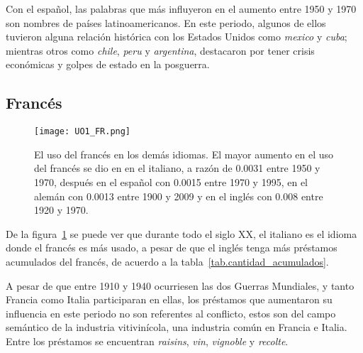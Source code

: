 Con el español, las palabras que más influyeron en el aumento entre 1950 y 1970 son nombres de países latinoamericanos. En este periodo, algunos de ellos tuvieron alguna relación histórica con los Estados Unidos como \textit{mexico} y \textit{cuba}; mientras otros como \textit{chile}, \textit{peru} y \textit{argentina}, destacaron por tener crisis económicas y golpes de estado en la posguerra.  
\label{D-EN}


 



\subsection{Francés} %

\begin{figure}[h!]
	\centering
	\texttt{[image: UO1\_FR.png]}
	\caption{El uso del francés en los demás idiomas. El mayor aumento en el uso del francés se dio en en el italiano, a razón de 0.0031 entre 1950 y 1970, después en el español con 0.0015 entre 1970 y 1995, en el alemán con 0.0013 entre 1900 y 2009	 y en el inglés con 0.008 entre 1920 y 1970.}
	\label{fig.UO_FR}
\end{figure}

De la figura~\ref{fig.UO_FR} se puede ver que durante todo el siglo XX, el italiano es el idioma donde el francés es más usado, a pesar de que el inglés tenga más préstamos acumulados del francés, de acuerdo a la tabla~\ref{tab.cantidad_acumulados}. 


A pesar de que entre 1910 y 1940 ocurriesen las dos Guerras Mundiales, y tanto Francia como Italia participaran en ellas,  los préstamos que aumentaron su influencia en este periodo no son referentes al conflicto, estos son del campo semántico de la industria vitivinícola, una industria común en Francia e Italia. Entre los préstamos se encuentran \textit{raisins}, \textit{vin}, \textit{vignoble} y \textit{recolte}. 


